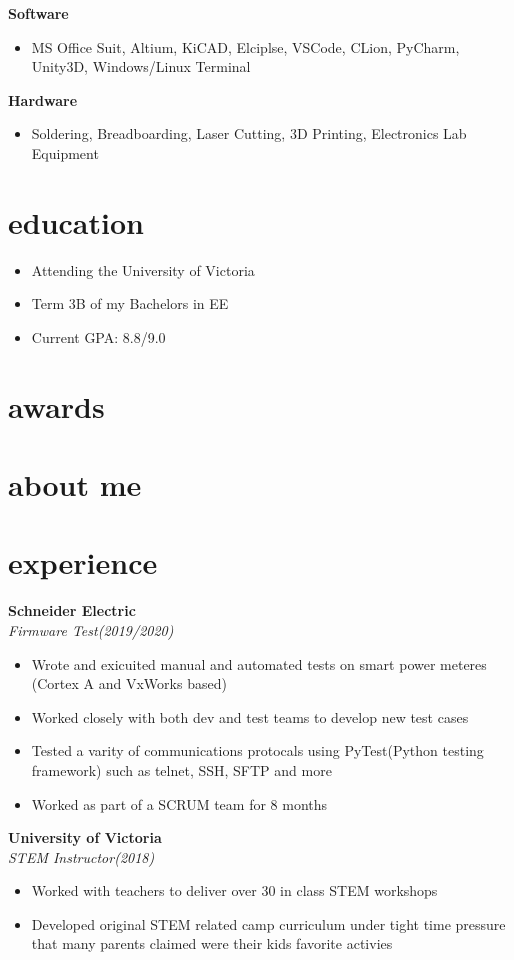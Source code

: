 \documentclass{article}
\newcommand{\minicolumns}[2]{
  \begin{minipage}[t]{0.25\textwidth}
    \begin{flushright}
      #1
    \end{flushright}
  \end{minipage}
  \hfill    
  \begin{minipage}[t]{0.7\textwidth}
    #2
  \end{minipage}   
}
\newcommand{\resumeSection}[3]{
  \minicolumns{
      \textbf{#1}\\          
      \textit{#2}
    }
    {  
      \begin{itemize}[leftmargin=*]
          \setlength\itemsep{-0.1em}
          #3
      \end{itemize}
  }
  \vspace{1em}
}
\begin{document}
\begin{minipage}[t]{0.65\textwidth}
  \resumeSection{Software}{}{
    \item MS Office Suit, Altium, KiCAD, Elciplse, VSCode, CLion, PyCharm, Unity3D, Windows/Linux Terminal
    }

  \resumeSection{Hardware}{}{
    \item Soldering, Breadboarding, Laser Cutting, 3D Printing, Electronics Lab Equipment
  }
\end{minipage}
\begin{minipage}[t]{0.34\textwidth}
  \section{education}
  \begin{itemize}
    \setlength\itemsep{-0.1em}
    \item Attending the University of Victoria
    \item Term 3B of my Bachelors in EE
    \item Current GPA: 8.8/9.0
  \end{itemize}

  \section{awards}
  \section{about me}
\end{minipage}

\section{experience}
\resumeSection{Schneider Electric}{Firmware Test(2019/2020)}{
  \item Wrote and exicuited manual and automated tests on smart power meteres (Cortex A and VxWorks based)
  \item Worked closely with both dev and test teams to develop new test cases
  \item Tested a varity of communications protocals using PyTest(Python testing framework) such as telnet, SSH, SFTP and more
  \item Worked as part of a SCRUM team for 8 months
}

\resumeSection{University of Victoria}{STEM Instructor(2018)}{
  \item Worked with teachers to deliver over 30 in class STEM workshops
  \item Developed original STEM related camp curriculum under tight time pressure 
  that many parents claimed were their kids favorite activies
}
\end{document}
